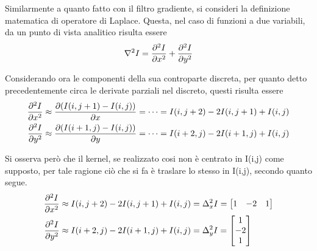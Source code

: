 \documentclass{subfiles}
\begin{document}
Similarmente a quanto fatto con il filtro gradiente, si consideri la definizione matematica di operatore di Laplace.
Questa, nel caso di funzioni a due variabili, da un punto di vista analitico risulta essere
\[
    \laplacian{I} = \pdv[2]{I}{x} + \pdv[2]{I}{y}
\]

Considerando ora le componenti della sua controparte discreta, per quanto detto precedentemente circa le derivate parziali nel discreto, questi risulta essere
\[\begin{aligned}
        \pdv[2]{I}{x} & \approx \pdv{(I(i, j + 1) - I(i,j))}{x} = \cdots = I(i, j + 2) - 2I(i, j + 1) + I(i, j) \\
        \pdv[2]{I}{y} & \approx \pdv{(I(i + 1, j) - I(i,j))}{y} = \cdots = I(i + 2, j) - 2I(i + 1, j) + I(i, j) \\
    \end{aligned}\]

Si osserva però che il kernel, se realizzato cosi non è centrato in I(i,j) come supposto, per tale ragione ciò che si fa è traslare lo stesso in I(i,j),
secondo quanto segue.
\[\begin{aligned}
        \pdv[2]{I}{x} & \approx I(i, j + 2) - 2I(i, j + 1) + I(i, j) = \Delta^{2}_{x}I = \begin{bmatrix}
                                                                                             1 & -2 & 1 \\
                                                                                         \end{bmatrix} \\
        \pdv[2]{I}{y} & \approx I(i + 2, j) - 2I(i + 1, j) + I(i, j) = \Delta^{2}_{y}I = \begin{bmatrix}
                                                                                             1  \\
                                                                                             -2 \\
                                                                                             1  \\
                                                                                         \end{bmatrix} \\
    \end{aligned}\]
\end{document}
